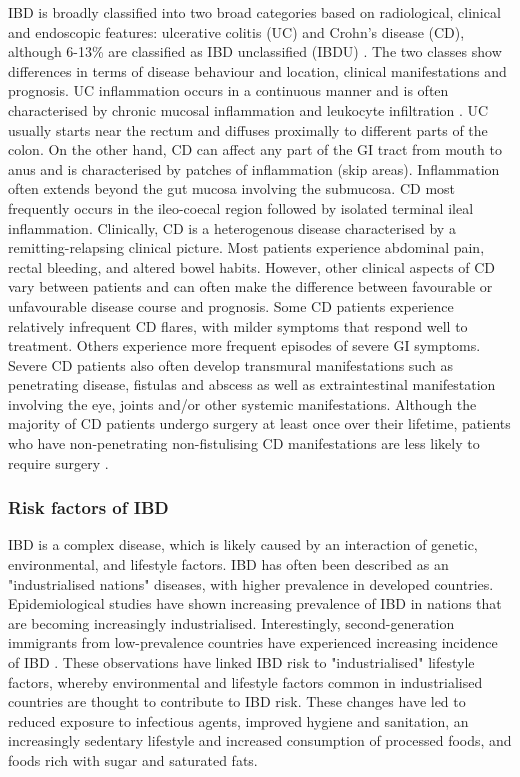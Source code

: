 IBD is broadly classified into two broad categories based on radiological, clinical and endoscopic features: ulcerative colitis (UC) and Crohn's disease (CD), although 6-13\% are classified as IBD unclassified (IBDU) \cite{Thurgate2019-xj}. The two classes show differences in terms of disease behaviour and location, clinical manifestations and prognosis. UC inflammation occurs in a continuous manner and is often characterised by chronic mucosal inflammation and leukocyte infiltration \cite{Hendrickson2002-ky}. UC usually starts near the rectum and diffuses proximally to different parts of the colon. On the other hand, CD can affect any part of the GI tract from mouth to anus and is characterised by patches of inflammation (skip areas). Inflammation often extends beyond the gut mucosa involving the submucosa. CD most frequently occurs in the ileo-coecal region followed by isolated terminal ileal inflammation. Clinically, CD is a heterogenous disease characterised by a remitting-relapsing clinical picture. Most patients experience abdominal pain, rectal bleeding, and altered bowel habits. However, other clinical aspects of CD vary between patients and can often make the difference between favourable or unfavourable disease course and prognosis. Some CD patients experience relatively infrequent CD flares, with milder symptoms that respond well to treatment. Others experience more frequent episodes of severe GI symptoms. Severe CD patients also often develop transmural manifestations such as penetrating disease, fistulas and abscess as well as extraintestinal manifestation involving the eye, joints and/or other systemic manifestations. Although the majority of CD patients undergo surgery at least once over their lifetime, patients who have non-penetrating non-fistulising CD manifestations are less likely to require surgery \cite{Lewis2010-gx}. %



\subsubsection{Risk factors of IBD}
IBD is a complex disease, which is likely caused by an interaction of genetic, environmental, and lifestyle factors. IBD has often been described as an "industrialised nations" diseases, with higher prevalence in developed countries. Epidemiological studies have shown increasing prevalence of IBD in nations that are becoming increasingly industrialised. Interestingly, second-generation immigrants from low-prevalence countries have experienced increasing incidence of IBD \cite{Bernstein2008-ln}. These observations have linked IBD risk to "industrialised" lifestyle factors, whereby environmental and lifestyle factors common in industrialised countries are thought to contribute to IBD risk. These changes have led to reduced exposure to infectious agents, improved hygiene and sanitation, an increasingly sedentary lifestyle and increased consumption of processed foods, and foods rich with sugar and saturated fats.\\

